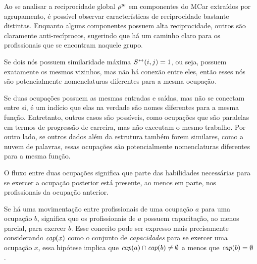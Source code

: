 \documentclass[12pt,a4paper]{article}
\begin{document}
Ao se analisar a reciprocidade global $\rho^w$ em componentes do MCar extraídos por agrupamento, é possível observar características de reciprocidade bastante distintas. Enquanto alguns componentes possuem alta reciprocidade, outros são claramente anti-recíprocos, sugerindo que há um caminho claro para os profissionais que se encontram naquele grupo.

\begin{hypothesis}
    Se dois nós possuem similaridade máxima $S^\leftrightarrow(i,j) = 1$, ou seja, possuem exatamente os mesmos vizinhos, mas não há conexão entre eles, então esses nós são potencialmente nomenclaturas diferentes para a mesma ocupação.
\end{hypothesis}

Se duas ocupações possuem as mesmas entradas e saídas, mas não se conectam entre si, é um indício que elas na verdade são nomes diferentes para a mesma função. Entretanto, outros casos são possíveis, como ocupações que são paralelas em termos de progressão de carreira, mas não executam o mesmo trabalho. Por outro lado, se outros dados além da estrutura também forem similares, como a nuvem de palavras, essas ocupações são potencialmente nomenclaturas diferentes para a mesma função.

\begin{hypothesis} \label{hip:capacitacao-suficiente}
    O fluxo entre duas ocupações significa que parte das habilidades necessárias para se exercer a ocupação posterior está presente, ao menos em parte, nos profissionais da ocupação anterior.
\end{hypothesis}

Se há uma movimentação entre profissionais de uma ocupação $a$ para uma ocupação $b$, significa que os profissionais de $a$ possuem capacitação, ao menos parcial, para exercer $b$. Esse conceito pode ser expresso mais precisamente considerando $\textit{cap}(x)$ como o conjunto de \textit{capacidades} para se exercer uma ocupação $x$, essa hipótese implica que $\textit{cap}(a) \cap \textit{cap}(b)  \ne \emptyset$ a menos que $\textit{cap}(b) = \emptyset$.
\end{document}
